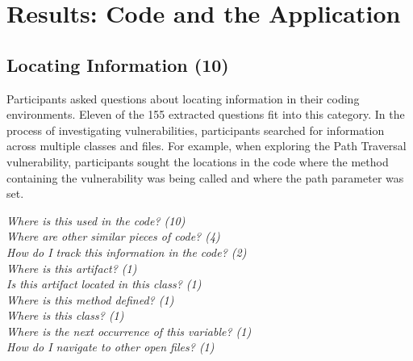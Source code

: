 \documentclass[conference]{IEEEtran}
\begin{document}


\section{Results: Code and the Application}
\label{sec:results-ca}





\noindent\subsection{\textbf{Locating Information (10)}}\label{li}

Participants asked questions about locating information in their coding environments. 
Eleven of the 155 extracted questions fit into this category.
In the process of investigating vulnerabilities, participants searched for information across multiple classes and files.
For example, when exploring the Path Traversal vulnerability, participants sought the locations in the code where the method containing the vulnerability was being called and where the path parameter was set.

\noindent\emph{Where is this used in the code? (10)} \\
\emph{Where are other similar pieces of code? (4)} \\
\emph{How do I track this information in the code? (2)} \\
\emph{Where is this artifact? (1)} \\
\emph{Is this artifact located in this class? (1)} \\
\emph{Where is this method defined? (1)} \\
\emph{Where is this class? (1)} \\
\emph{Where is the next occurrence of this variable? (1)} \\
\emph{How do I navigate to other open files? (1)} \\
\end{document}
